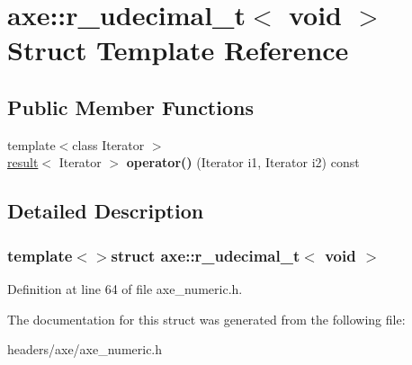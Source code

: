 \hypertarget{structaxe_1_1r__udecimal__t_3_01void_01_4}{\section{axe\+:\+:r\+\_\+udecimal\+\_\+t$<$ void $>$ Struct Template Reference}
\label{structaxe_1_1r__udecimal__t_3_01void_01_4}
}
\subsection*{Public Member Functions}
\begin{DoxyCompactItemize}
\item 
\hypertarget{structaxe_1_1r__udecimal__t_3_01void_01_4_abe69bbf043a27396d6331f51ef92670a}{{\footnotesize template$<$class Iterator $>$ }\\\hyperlink{structaxe_1_1result}{result}$<$ Iterator $>$ {\bfseries operator()} (Iterator i1, Iterator i2) const }\label{structaxe_1_1r__udecimal__t_3_01void_01_4_abe69bbf043a27396d6331f51ef92670a}

\end{DoxyCompactItemize}


\subsection{Detailed Description}
\subsubsection*{template$<$$>$struct axe\+::r\+\_\+udecimal\+\_\+t$<$ void $>$}



Definition at line 64 of file axe\+\_\+numeric.\+h.



The documentation for this struct was generated from the following file\+:\begin{DoxyCompactItemize}
\item 
headers/axe/axe\+\_\+numeric.\+h\end{DoxyCompactItemize}

